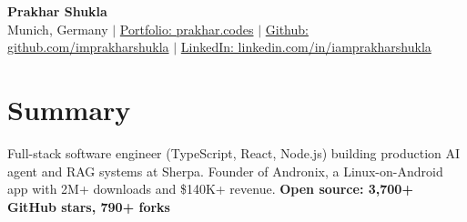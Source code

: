 \documentclass[a4paper,10pt]{article}
\begin{document}
\begin{center}
  \textbf{{\LARGE Prakhar Shukla}} \\
  \vspace{2pt}
  Munich, Germany $|$ \href{https://prakhar.codes}{Portfolio: prakhar.codes} $|$ \href{https://github.com/imprakharshukla}{Github: github.com/imprakharshukla} $|$ \href{https://linkedin.com/in/iamprakharshukla}{LinkedIn: linkedin.com/in/iamprakharshukla}
\end{center}

\section{Summary}
\vspace{2pt}
Full-stack software engineer (TypeScript, React, Node.js) building production AI agent and RAG systems at Sherpa. Founder of Andronix, a Linux-on-Android app with 2M+ downloads and \$140K+ revenue. \textbf{Open source: 3,700+ GitHub stars, 790+ forks}

\end{document}
